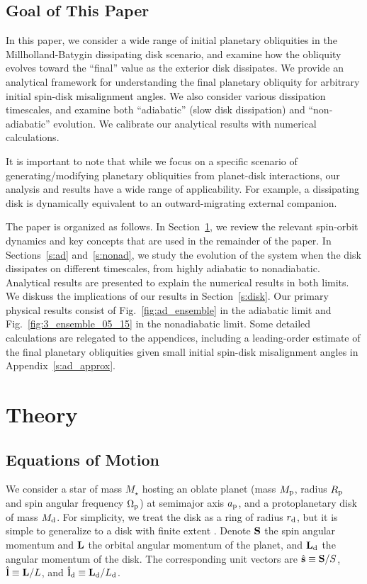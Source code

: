 \subsection{Goal of This Paper}

In this paper, we consider a wide range of initial planetary obliquities in the
Millholland-Batygin dissipating disk scenario, and examine how the obliquity
evolves toward the ``final'' value as the exterior disk dissipates. We provide
an analytical framework for understanding the final planetary obliquity for
arbitrary initial spin-disk misalignment angles. We also consider various
dissipation timescales, and examine both ``adiabatic'' (slow disk dissipation)
and ``non-adiabatic'' evolution. We calibrate our analytical results with
numerical calculations.

It is important to note that while we focus on a specific scenario of
generating/modifying planetary obliquities from planet-disk interactions, our
analysis and results have a wide range of applicability. For example, a
dissipating disk is dynamically equivalent to an outward-migrating external
companion.

The paper is organized as follows. In Section~\ref{s:eq}, we review the relevant
spin-orbit dynamics and key concepts that are used in the remainder of the
paper. In Sections~\ref{s:ad} and~\ref{s:nonad}, we study the evolution of the
system when the disk dissipates on different timescales, from highly adiabatic
to nonadiabatic. Analytical results are presented to explain the numerical
results in both limits. We diskuss the implications of our results in
Section~\ref{s:disk}. Our primary physical results consist of
Fig.~\ref{fig:ad_ensemble} in the adiabatic limit and
Fig.~\ref{fig:3_ensemble_05_15} in the nonadiabatic limit. Some detailed
calculations are relegated to the appendices, including a leading-order
estimate of the final planetary obliquities given small initial spin-disk
misalignment angles in Appendix~\ref{s:ad_approx}.

\section{Theory}\label{s:eq}

\subsection{Equations of Motion}

We consider a star of mass $M_\star$ hosting an oblate planet (mass $M_{\rm p}$,
radius $R_{\rm p}$ and spin angular frequency $\Omega_{\rm p}$) at semimajor
axis $a_{\rm p}$, and a protoplanetary disk of mass $M_{\rm d}$. For simplicity,
we treat the disk as a ring of radius $r_{\rm d}$, but it is simple to
generalize to a disk with finite extent \citep[see][]{millholland_disk}. Denote
$\boldsymbol{\mathbf{S}}$ the spin angular momentum and $\boldsymbol{\mathbf{L}}$ the orbital angular momentum of
the planet, and $\boldsymbol{\mathbf{L}}_{\rm d}$ the angular momentum of the disk. The
corresponding unit vectors are $\hat{\boldsymbol{\mathbf{s}}} \equiv \boldsymbol{\mathbf{S}} / S$, $\hat{\boldsymbol{\mathbf{l}}} \equiv \boldsymbol{\mathbf{L}}
/ L$, and $\hat{\boldsymbol{\mathbf{l}}}_{\rm d} \equiv \boldsymbol{\mathbf{L}}_{\rm d} / L_{\rm d}$.

